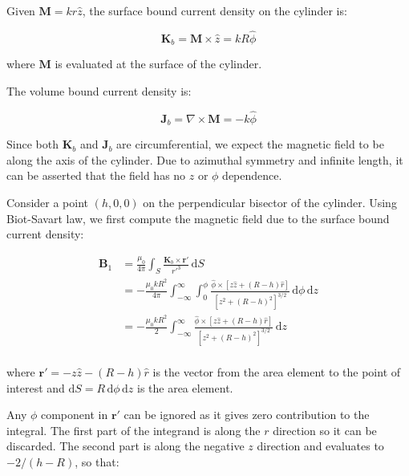 \documentclass[12pt]{article}
\begin{document}
Given $\mathbf{M} = kr \hat{z}$, the surface bound current density on the cylinder is:

\begin{equation}
    \mathbf{K}_{b} = \mathbf{M} \times \hat{z} = kR \hat{\phi}
\end{equation}

where $\mathbf{M}$ is evaluated at the surface of the cylinder.

The volume bound current density is:

\begin{equation}
    \mathbf{J}_{b} = \nabla \times \mathbf{M} = -k \hat{\phi}
\end{equation}

Since both $\mathbf{K}_{b}$ and $\mathbf{J}_{b}$ are circumferential, we expect the magnetic field to be along the axis of the cylinder. Due to azimuthal symmetry and infinite length, it can be asserted that the field has no $z$ or $\phi$ dependence.

Consider a point $(h, 0, 0)$ on the perpendicular bisector of the cylinder. Using Biot-Savart law, we first compute the magnetic field due to the surface bound current density:

\begin{equation}
    \begin{split}
        \mathbf{B}_{1} &= \frac{\mu_{0}}{4\pi} \int_{S} \frac{\mathbf{K}_{b} \times \mathbf{r}'}{r'^{3}} \, \mathrm{d}S \\
        &= -\frac{\mu_{0}kR^{2}}{4\pi} \int_{-\infty}^{\infty} \int_{0}^{\phi} \frac{\hat{\phi} \times [z \hat{z} + (R-h) \hat{r}]}{[z^{2} + (R-h)^{2}]^{3/2}} \, \mathrm{d}\phi \, \mathrm{d}z \\
        &= -\frac{\mu_{0}kR^{2}}{2} \int_{-\infty}^{\infty} \frac{\hat{\phi} \times [z \hat{z} + (R-h) \hat{r}]}{[z^{2} + (R-h)^{2}]^{3/2}} \, \mathrm{d}z \\
    \end{split}
\end{equation}

where $\mathbf{r}' = -z \hat{z} - (R-h) \hat{r}$ is the vector from the area element to the point of interest and $\mathrm{d}S = R \, \mathrm{d}\phi \, \mathrm{d}z$ is the area element.

Any $\phi$ component in $\mathbf{r}'$ can be ignored as it gives zero contribution to the integral. The first part of the integrand is along the $r$ direction so it can be discarded. The second part is along the negative $z$ direction and evaluates to $-2/(h-R)$, so that:
\end{document}
